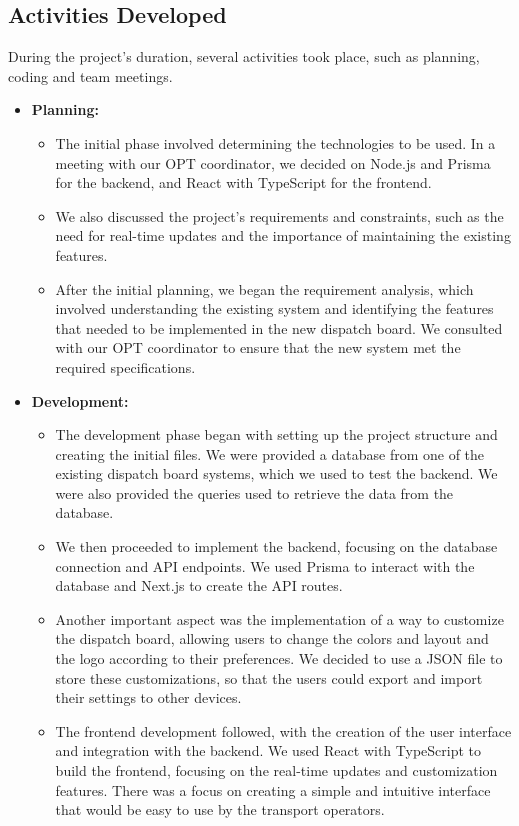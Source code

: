 \documentclass{article}
\begin{document}
\subsection{Activities Developed}
During the project’s duration, several activities took place, such as planning, coding and team meetings.

\begin{itemize}
    \item \textbf{Planning:}
    \begin{itemize}
        \item     The initial phase involved determining the technologies to be used. In a meeting with our OPT coordinator, we decided on Node.js and Prisma for the backend, and React with TypeScript for the frontend.
        \item     We also discussed the project's requirements and constraints, such as the need for real-time updates and the importance of maintaining the existing features.
        \item     After the initial planning, we began the requirement analysis, which involved understanding the existing system and identifying the features that needed to be implemented in the new dispatch board. We consulted with our OPT coordinator to ensure that the new system met the required specifications.
    \end{itemize}
    \item \textbf{Development:}
    \begin{itemize}
        \item     The development phase began with setting up the project structure and creating the initial files. We were provided a database from one of the existing dispatch board systems, which we used to test the backend. We were also provided the queries used to retrieve the data from the database.
        \item     We then proceeded to implement the backend, focusing on the database connection and API endpoints. We used Prisma to interact with the database and Next.js to create the API routes.
        \item     Another important aspect was the implementation of a way to customize the dispatch board, allowing users to change the colors and layout and the logo according to their preferences. We decided to use a JSON file to store these customizations, so that the users could export and import their settings to other devices.
        \item     The frontend development followed, with the creation of the user interface and integration with the backend. We used React with TypeScript to build the frontend, focusing on the real-time updates and customization features. There was a focus on creating a simple and intuitive interface that would be easy to use by the transport operators.

\end{itemize}
\end{itemize}
\end{document}
